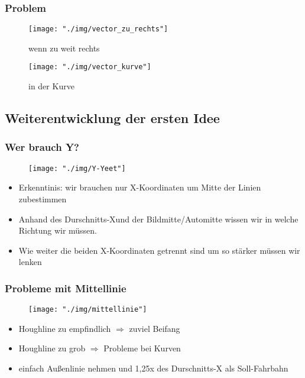 \documentclass{beamer}
\begin{document}
	\begin{frame}
		\frametitle{Problem}
		\begin{center}
			\begin{figure}[h]
				\texttt{[image: "./img/vector\_zu\_rechts"]}
				\caption{wenn zu weit rechts}
				\label{fig:Lenkung via Vektoren zu weit rechts}
			\end{figure}
		\end{center}
		\begin{center}
				\begin{figure}[h]
					\texttt{[image: "./img/vector\_kurve"]}
					\caption{in der Kurve}
					\label{fig:Lenkung via Vektoren in Kurve}
				\end{figure}
			\end{center}
		
	\end{frame}

	\subsection{Weiterentwicklung der ersten Idee}

	\begin{frame}
		\frametitle{Wer brauch Y?}
		\begin{center}
			\begin{figure}[h]
				\texttt{[image: "./img/Y-Yeet"]}
				\label{fig:Weg mit dem Y}
			\end{figure}
		\end{center}

		\begin{itemize}
			\item Erkenntinis: wir brauchen nur X-Koordinaten um Mitte der Linien 		zubestimmen
			\item Anhand des \glqq Durschnitts-X\grqq  und der Bildmitte/Automitte wissen wir in welche Richtung wir müssen. 
			\item Wie weiter die beiden X-Koordinaten getrennt sind um so stärker müssen wir lenken 
		\end{itemize}
	\end{frame}

	\begin{frame}
		\frametitle{Probleme mit Mittellinie}
		\begin{center}
			\begin{figure}[h]
				\texttt{[image: "./img/mittellinie"]}
				\label{fig:Mittellinie}
			\end{figure}
		\end{center}
		
		\begin{itemize}
			\item Houghline zu empfindlich $\Rightarrow$ zuviel \glqq Beifang\grqq 
			\item Houghline zu grob $\Rightarrow$ Probleme bei Kurven
			\item einfach Außenlinie nehmen und 1,25x des Durschnitts-X als Soll-Fahrbahn
		\end{itemize}
	\end{frame}
\end{document}
